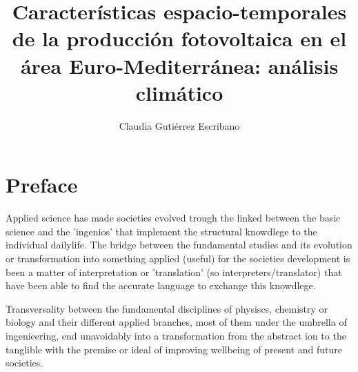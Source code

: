 \documentclass[oldfontcommands, b5paper]{memoir}%
\begin{document}


\begin{titlingpage}


\title{Características espacio-temporales de la producción fotovoltaica en el área Euro-Mediterránea: análisis climático}

\author{Claudia Gutiérrez Escribano}
\date{}

\maketitle


\end{titlingpage}

\frontmatter


%

\chapter{Preface}
Applied science has made societies evolved trough the linked between the basic science and the 'ingenios' that implement the structural knowdlege to the individual dailylife. The bridge between the fundamental studies and its evolution or transformation into something applied (useful) for the societies development is been a matter of interpretation or 'translation' (so interpreters/translator) that have been able to find the accurate language to exchange this knowdlege.


Transversality between the fundamental disciplines of physiscs, chemistry or biology and their different applied branches, most of them under the umbrella of ingenieering, end unavoidably into a transformation from the abstract
ion to the tanglible with the premise or ideal of improving wellbeing of present and future societies.

\end{document}
